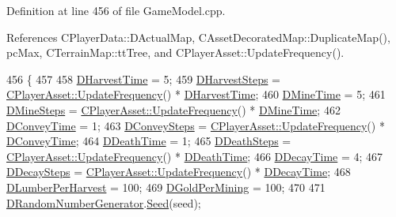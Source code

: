 Definition at line 456 of file Game\+Model.\+cpp.



References C\+Player\+Data\+::\+D\+Actual\+Map, C\+Asset\+Decorated\+Map\+::\+Duplicate\+Map(), pc\+Max, C\+Terrain\+Map\+::tt\+Tree, and C\+Player\+Asset\+::\+Update\+Frequency().


\begin{DoxyCode}
456                                                                                 \{
457 
458     \hyperlink{classCGameModel_a0160295e3cf06b7bbcb9247bc49e3156}{DHarvestTime} = 5;
459     \hyperlink{classCGameModel_a719733742e1340921a12efce992b07fe}{DHarvestSteps} = \hyperlink{classCPlayerAsset_a0aff85b9552967a42f4f3f42cb59c19f}{CPlayerAsset::UpdateFrequency}() * 
      \hyperlink{classCGameModel_a0160295e3cf06b7bbcb9247bc49e3156}{DHarvestTime};
460     \hyperlink{classCGameModel_ab7bd9d3b4852d539aa605177ae2f27e8}{DMineTime} = 5;
461     \hyperlink{classCGameModel_a9f3d8b652f62a0a1b993cb2402800203}{DMineSteps} = \hyperlink{classCPlayerAsset_a0aff85b9552967a42f4f3f42cb59c19f}{CPlayerAsset::UpdateFrequency}() * 
      \hyperlink{classCGameModel_ab7bd9d3b4852d539aa605177ae2f27e8}{DMineTime};
462     \hyperlink{classCGameModel_a4452faa5aa4b062cde343ccd24166232}{DConveyTime} = 1;
463     \hyperlink{classCGameModel_ad322487a9b50d395fe69c7ad95b71a10}{DConveySteps} = \hyperlink{classCPlayerAsset_a0aff85b9552967a42f4f3f42cb59c19f}{CPlayerAsset::UpdateFrequency}() * 
      \hyperlink{classCGameModel_a4452faa5aa4b062cde343ccd24166232}{DConveyTime};
464     \hyperlink{classCGameModel_a2ddf991af7749f946a4fe242b2397b9a}{DDeathTime} = 1;
465     \hyperlink{classCGameModel_a8067a8f3737b0f1d6fced523926ce167}{DDeathSteps} = \hyperlink{classCPlayerAsset_a0aff85b9552967a42f4f3f42cb59c19f}{CPlayerAsset::UpdateFrequency}() * 
      \hyperlink{classCGameModel_a2ddf991af7749f946a4fe242b2397b9a}{DDeathTime};
466     \hyperlink{classCGameModel_abd062550cd4f0f9286f78f3195fe2f71}{DDecayTime} = 4;
467     \hyperlink{classCGameModel_ac4a0ea3659c796b1c4f8b1f91d0e3258}{DDecaySteps} = \hyperlink{classCPlayerAsset_a0aff85b9552967a42f4f3f42cb59c19f}{CPlayerAsset::UpdateFrequency}() * 
      \hyperlink{classCGameModel_abd062550cd4f0f9286f78f3195fe2f71}{DDecayTime};
468     \hyperlink{classCGameModel_abfa4628f678b64ecfefb9f56150d906f}{DLumberPerHarvest} = 100;
469     \hyperlink{classCGameModel_a886529fe17365373d28c2881fdaa21f0}{DGoldPerMining} = 100;
470     
471     \hyperlink{classCGameModel_a3fb9b6b40f397c022087f381f63954b9}{DRandomNumberGenerator}.\hyperlink{classCRandomNumberGenerator_a9b6f52335ea93f1aaec4521c66806f39}{Seed}(seed);

\end{DoxyCode}
